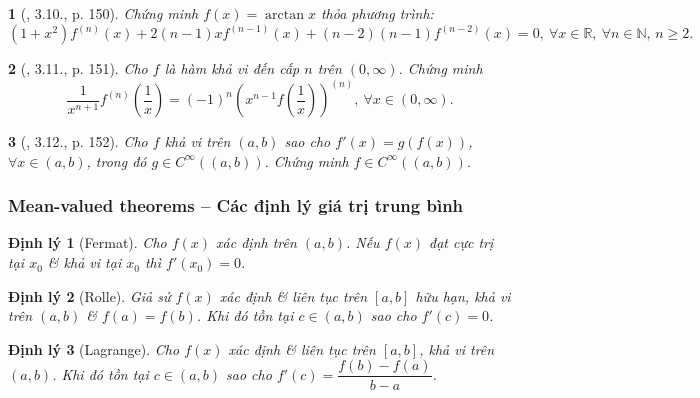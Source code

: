 \documentclass{article}
\newtheorem{baitoan}{}
\newtheorem{dinhly}{Định lý}
\begin{document}
\begin{baitoan}[\cite{Quoc_Long_Dat_Nam_VMC}, 3.10., p. 150]
	Chứng minh $f(x) = \arctan x$ thỏa phương trình:
	\begin{equation*}
		(1 + x^2)f^{(n)}(x) + 2(n - 1)xf^{(n-1)}(x) + (n - 2)(n - 1)f^{(n-2)}(x) = 0,\ \forall x\in\mathbb{R},\ \forall n\in\mathbb{N},\,n\ge2.
	\end{equation*}
\end{baitoan}

\begin{baitoan}[\cite{Quoc_Long_Dat_Nam_VMC}, 3.11., p. 151]
	Cho $f$ là hàm khả vi đến cấp $n$ trên $(0,\infty)$. Chứng minh
	\begin{equation*}
		\frac{1}{x^{n+1}}f^{(n)}\left(\frac{1}{x}\right) = (-1)^n\left(x^{n-1}f\left(\frac{1}{x}\right)\right)^{(n)},\ \forall x\in(0,\infty).
	\end{equation*}
\end{baitoan}

\begin{baitoan}[\cite{Quoc_Long_Dat_Nam_VMC}, 3.12., p. 152]
	Cho $f$ khả vi trên $(a,b)$ sao cho $f'(x) = g(f(x))$, $\forall x\in(a,b)$, trong đó $g\in C^\infty((a,b))$. Chứng minh $f\in C^\infty((a,b))$.
\end{baitoan}


\subsubsection{Mean-valued theorems -- Các định lý giá trị trung bình}

\begin{dinhly}[Fermat]
	Cho $f(x)$ xác định trên $(a,b)$. Nếu $f(x)$ đạt cực trị tại $x_0$ \& khả vi tại $x_0$ thì $f'(x_0) = 0$.
\end{dinhly}

\begin{dinhly}[Rolle]
	Giả sử $f(x)$ xác định \& liên tục trên $[a,b]$ hữu hạn, khả vi trên $(a,b)$ \& $f(a) = f(b)$. Khi đó tồn tại $c\in(a,b)$ sao cho $f'(c) = 0$.
\end{dinhly}

\begin{dinhly}[Lagrange]
	Cho $f(x)$ xác định \& liên tục trên $[a,b]$, khả vi trên $(a,b)$. Khi đó tồn tại $c\in(a,b)$ sao cho $f'(c) = \dfrac{f(b) - f(a)}{b - a}$.
\end{dinhly}
\end{document}

